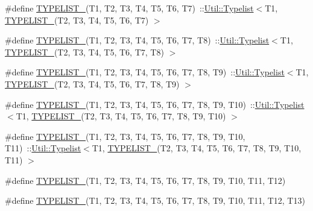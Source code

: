 \begin{DoxyCompactItemize}
\item 
\#define \mbox{\hyperlink{adat-devel_2lib_2adat_2typelist_8h_aeb724ee75c2a90ed93d4eddef2357a8b}{T\+Y\+P\+E\+L\+I\+S\+T\+\_}}(T1,  T2,  T3,  T4,  T5,  T6,  T7)~\+::\mbox{\hyperlink{structUtil_1_1Typelist}{Util\+::\+Typelist}}$<$T1, \mbox{\hyperlink{adat__devel__install_2include_2adat_2typelist_8h_ac6f3277dcaade98ceeaa5c0e1c454816}{T\+Y\+P\+E\+L\+I\+S\+T\+\_}}(T2, T3, T4, T5, T6, T7) $>$
\item 
\#define \mbox{\hyperlink{adat-devel_2lib_2adat_2typelist_8h_ad828864baaf3cc2505a37b8227c53c20}{T\+Y\+P\+E\+L\+I\+S\+T\+\_}}(T1,  T2,  T3,  T4,  T5,  T6,  T7,  T8)~\+::\mbox{\hyperlink{structUtil_1_1Typelist}{Util\+::\+Typelist}}$<$T1, \mbox{\hyperlink{adat__devel__install_2include_2adat_2typelist_8h_aeb724ee75c2a90ed93d4eddef2357a8b}{T\+Y\+P\+E\+L\+I\+S\+T\+\_}}(T2, T3, T4, T5, T6, T7, T8) $>$
\item 
\#define \mbox{\hyperlink{adat-devel_2lib_2adat_2typelist_8h_ac938e9eedc71479614ff131e99f58f38}{T\+Y\+P\+E\+L\+I\+S\+T\+\_}}(T1,  T2,  T3,  T4,  T5,  T6,  T7,  T8,  T9)~\+::\mbox{\hyperlink{structUtil_1_1Typelist}{Util\+::\+Typelist}}$<$T1, \mbox{\hyperlink{adat__devel__install_2include_2adat_2typelist_8h_ad828864baaf3cc2505a37b8227c53c20}{T\+Y\+P\+E\+L\+I\+S\+T\+\_}}(T2, T3, T4, T5, T6, T7, T8, T9) $>$
\item 
\#define \mbox{\hyperlink{adat-devel_2lib_2adat_2typelist_8h_ab1b1b381fea18c4c22a2484f0d5c04a2}{T\+Y\+P\+E\+L\+I\+S\+T\+\_}}(T1,  T2,  T3,  T4,  T5,  T6,  T7,  T8,  T9,  T10)~\+::\mbox{\hyperlink{structUtil_1_1Typelist}{Util\+::\+Typelist}}$<$T1, \mbox{\hyperlink{adat__devel__install_2include_2adat_2typelist_8h_ac938e9eedc71479614ff131e99f58f38}{T\+Y\+P\+E\+L\+I\+S\+T\+\_}}(T2, T3, T4, T5, T6, T7, T8, T9, T10) $>$
\item 
\#define \mbox{\hyperlink{adat-devel_2lib_2adat_2typelist_8h_a0d030b6f5e74275dfbb69a70b7342305}{T\+Y\+P\+E\+L\+I\+S\+T\+\_}}(T1,  T2,  T3,  T4,  T5,  T6,  T7,  T8,  T9,  T10,  T11)~\+::\mbox{\hyperlink{structUtil_1_1Typelist}{Util\+::\+Typelist}}$<$T1, \mbox{\hyperlink{adat__devel__install_2include_2adat_2typelist_8h_ab1b1b381fea18c4c22a2484f0d5c04a2}{T\+Y\+P\+E\+L\+I\+S\+T\+\_}}(T2, T3, T4, T5, T6, T7, T8, T9, T10, T11) $>$
\item 
\#define \mbox{\hyperlink{adat-devel_2lib_2adat_2typelist_8h_a159bea7064aa3573515fc55c607dee78}{T\+Y\+P\+E\+L\+I\+S\+T\+\_}}(T1,  T2,  T3,  T4,  T5,  T6,  T7,  T8,  T9,  T10,  T11,  T12)
\item 
\#define \mbox{\hyperlink{adat-devel_2lib_2adat_2typelist_8h_a47dad1d657d3bcf3e5ebf7f3dc689f2c}{T\+Y\+P\+E\+L\+I\+S\+T\+\_}}(T1,  T2,  T3,  T4,  T5,  T6,  T7,  T8,  T9,  T10,  T11,  T12,  T13)

\end{DoxyCompactItemize}
